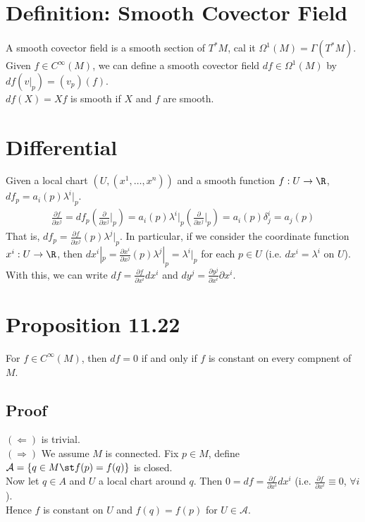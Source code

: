 \documentclass[11pt]{article}
\begin{document}
\section*{Definition: Smooth Covector Field}
\label{sec:org9c484e8}
A smooth covector field is a smooth section of \(T^{*}M\), cal it \(\Omega^{1}(M)=\Gamma(T^{*}M)\).\\
Given \(f\in C^{\infty}(M)\), we can define a smooth covector field \(df\in\Omega^{1}(M)\) by \(df(v|_{p})=(v_{p})(f)\).\\
\(df(X)=Xf\) is smooth if \(X\) and \(f\) are smooth.\\
\section*{Differential}
\label{sec:org88c1595}
Given a local chart \((U,(x^{1},\ldots,x^{n}))\) and a smooth function \(f:U\to\R\), \(df_{p}=a_{i}(p)\lambda^{i}|_{p}\).\\
\begin{align*}
  \frac{\partial f}{\partial x^{j}}
  =df_{p}\left( \frac{\partial}{\partial x^{j}}\Big|_{p} \right)
  =a_{i}(p)\lambda^{i}|_{p}\left( \frac{\partial}{\partial x^{j}}\Big|_{p} \right)
  =a_{i}(p)\delta^{i}_{j}
  =a_{j}(p)
\end{align*}
That is, \(df_{p}=\frac{\partial f}{\partial x^{j}}(p)\lambda^{j}|_{p}\). In particular, if we consider the coordinate function \(x^{i}:U\to\R\), then \(dx^{i}|_{p}=\frac{\partial x^{i}}{\partial x^{j}}(p)\lambda^{j}|_{p}=\lambda^{i}|_{p}\) for each \(p\in U\) (i.e. \(dx^{i}=\lambda^{i}\) on \(U\)).\\
With this, we can write \(df=\frac{\partial f}{\partial x^{i}}dx^{i}\) and \(dy^{j}=\frac{\partial y^{j}}{\partial x^{i}}\partial x^{i}\).\\
\section*{Proposition 11.22}
\label{sec:org1105d8d}
For \(f\in C^{\infty}(M)\), then \(df=0\) if and only if \(f\) is constant on every compnent of \(M\).\\
\subsection*{Proof}
\label{sec:org7d1ad99}
\((\Longleftarrow)\) is trivial.\\
\((\Longrightarrow)\) We assume \(M\) is connected. Fix \(p\in M\), define \(\mathcal{A}=\{q\in M\st f(p)=f(q)\}\) is closed.\\
Now let \(q\in A\) and \(U\) a local chart around \(q\). Then \(0=df=\frac{\partial f}{\partial x^{i}}dx^{i}\) (i.e. \(\frac{\partial f}{\partial x^{i}}\equiv 0\), \(\forall i\)).\\
Hence \(f\) is constant on \(U\) and \(f(q)=f(p)\) for \(U\in\mathcal{A}\).\\
\end{document}
